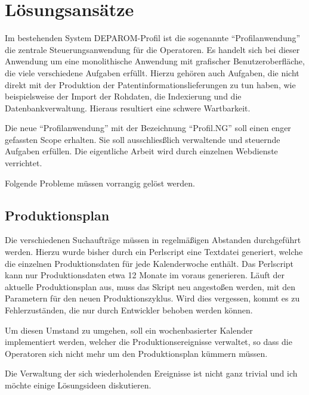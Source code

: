 
\chapter{Lösungsansätze} %

\label{ch:Lösungsansätze} %


Im bestehenden System DEPAROM-Profil ist die sogenannte "`Profilanwendung"' die
zentrale Steuerungsanwendung für die Operatoren. Es handelt sich bei dieser
Anwendung um eine monolithische Anwendung mit grafischer Benutzeroberfläche, die
viele verschiedene Aufgaben erfüllt. Hierzu gehören auch Aufgaben, die nicht
direkt mit der Produktion der Patentinformationslieferungen zu tun haben, wie
beispielsweise der Import der Rohdaten, die Indexierung und die
Datenbankverwaltung. Hieraus resultiert eine schwere Wartbarkeit.

Die neue "`Profilanwendung"' mit der Bezeichnung "`Profil.NG"' soll einen enger
gefassten Scope erhalten. Sie soll ausschliesßlich verwaltende und steuernde
Aufgaben erfüllen. Die eigentliche Arbeit wird durch einzelnen Webdienste
verrichtet.

Folgende Probleme müssen vorrangig gelöst werden.

\section{Produktionsplan}
\label{ch:Lösungsansätze:Produktionsplan}

Die verschiedenen Suchaufträge müssen in regelmäßigen Abstanden durchgeführt
werden. Hierzu wurde bisher durch ein Perlscript eine Textdatei generiert,
welche die einzelnen Produktionsdaten für jede Kalenderwoche enthält. Das
Perlscript kann nur Produktionsdaten etwa 12 Monate im voraus generieren. Läuft
der aktuelle Produktionsplan aus, muss das Skript neu angestoßen werden, mit den
Parametern für den neuen Produktionszyklus. Wird dies vergessen, kommt es zu
Fehlerzuständen, die nur durch Entwickler behoben werden können.

Um diesen Umstand zu umgehen, soll ein wochenbasierter Kalender implementiert
werden, welcher die Produktionsereignisse verwaltet, so dass die Operatoren sich
nicht mehr um den Produktionsplan kümmern müssen.

Die Verwaltung der sich wiederholenden Ereignisse ist nicht ganz trivial und ich
möchte einige Lösungsideen diskutieren.

